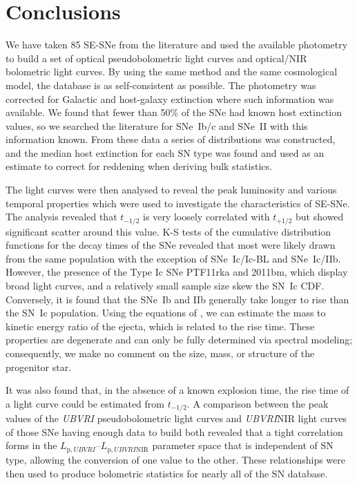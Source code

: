 \documentclass[a4paper,fleqn,usenatbib]{mnras}
\begin{document}
\section{Conclusions}
We have taken 85 SE-SNe from the literature and used the available photometry to build a set of optical pseudobolometric light curves and optical/NIR bolometric light curves. By using the same method and the same cosmological model, the database is as self-consistent as possible. The photometry was corrected for Galactic and host-galaxy extinction where such information was available. We found that fewer than 50\% of the SNe had known host extinction values, so we searched the literature for SNe~Ib/c and SNe~II with this information known. From these data a series of distributions was constructed, and the median host extinction for each SN type was found and used as an estimate to correct for reddening when deriving bulk statistics.
 
The light curves were then analysed to reveal the peak luminosity and various temporal properties which were used to investigate the characteristics of SE-SNe. The analysis revealed that $t_{-1/2}$ is very loosely correlated with $t_{+1/2}$ but showed significant scatter around this value. K-S tests of the cumulative distribution functions for the decay times of the SNe revealed that most were likely drawn from the same population with the exception of SNe~Ic/Ic-BL and SNe~Ic/IIb. However, the presence of the Type Ic SNe PTF11rka and 2011bm, which display broad light curves, and a relatively small sample size skew the SN~Ic CDF. Conversely, it is found that the SNe~Ib and IIb generally take longer to rise than the SN~Ic population. Using the equations of \cite{Arnett1982}, we can estimate the mass to kinetic energy ratio of the ejecta, which is related to the rise time. These properties are degenerate and can only be fully determined via spectral modeling; consequently, we make no comment on the size, mass, or structure of the progenitor star.

It was also found that, in the absence of a known explosion time, the rise time of a light curve could be estimated from $t_{-1/2}$. A comparison between the peak values of the \textit{UBVRI} pseudobolometric light curves and \textit{UBVRI}NIR light curves of those SNe having enough data to build both revealed that a tight correlation forms in the $L_{\mathrm{p,}UBVRI}$--$L_{\mathrm{p,}UBVRI\mathrm{NIR}}$ parameter space that is independent of SN type, allowing the conversion of one value to the other. These relationships were then used to produce bolometric statistics for nearly all of the SN database.
\end{document}
